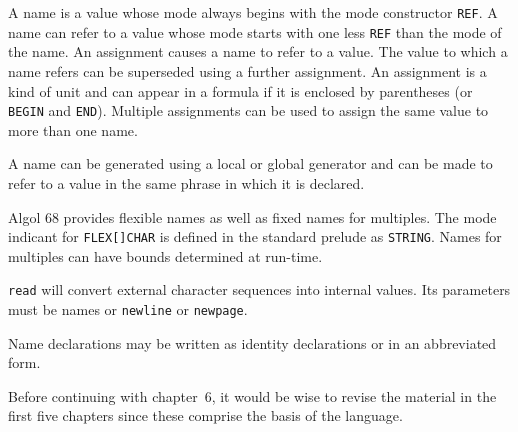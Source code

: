 A name is a value whose mode always begins with the mode constructor
\verb|REF|. A name can refer to a value whose mode starts with one
less \verb|REF| than the mode of the name.  An assignment causes a
name to refer to a value.  The value to which a name refers can be
superseded using a further assignment.  An assignment is a kind of
unit and can appear in a formula if it is enclosed by parentheses (or
\verb|BEGIN| and \verb|END|).  Multiple assignments can be used to
assign the same value to more than one name.

A name can be generated using a local or global generator and can be
made to refer to a value in the same phrase in which it is declared.

Algol 68 provides flexible names as well as fixed names for
multiples.  The mode indicant for \verb|FLEX[]CHAR| is defined in the
standard prelude as \verb|STRING|.  Names for multiples can have
bounds determined at run-time.

\verb|read| will convert external character sequences into internal
values.  Its parameters must be names or \verb|newline| or
\verb|newpage|.

Name declarations may be written as identity declarations or in an
abbreviated form.

Before continuing with chapter~6, it would be wise to revise the
material in the first five chapters since these comprise the basis of
the language.

